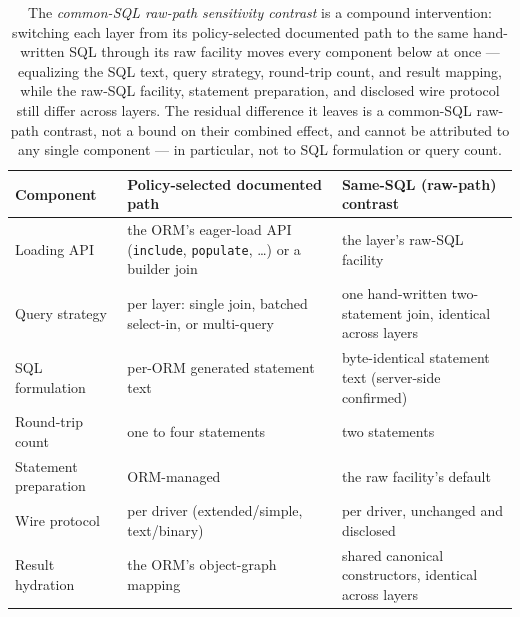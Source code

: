 \begin{table}[htbp]
  \centering
  \small
  \caption{The \emph{common-SQL raw-path sensitivity contrast} is a compound intervention: switching each layer from its
    policy-selected documented path to the same hand-written SQL through its raw facility moves every
    component below at once --- equalizing the SQL text, query strategy, round-trip count, and
    result mapping, while the raw-SQL facility, statement preparation, and disclosed wire protocol
    still differ across layers. The residual difference it leaves is a common-SQL raw-path contrast,
    not a bound on their combined effect, and cannot be attributed to any single component ---
    in particular, not to SQL formulation or query count.}
  \label{tab:samesql_components}
  \begin{tabular}{@{}l p{} p{}@{}}
    \toprule
    Component & Policy-selected documented path & Same-SQL (raw-path) contrast \\
    \midrule
    Loading API & the ORM's eager-load API (\texttt{include}, \texttt{populate}, \ldots) or a builder join & the layer's raw-SQL facility \\
    Query strategy & per layer: single join, batched select-in, or multi-query & one hand-written two-statement join, identical across layers \\
    SQL formulation & per-ORM generated statement text & byte-identical statement text (server-side confirmed) \\
    Round-trip count & one to four statements & two statements \\
    Statement preparation & ORM-managed & the raw facility's default \\
    Wire protocol & per driver (extended/simple, text/binary) & per driver, unchanged and disclosed \\
    Result hydration & the ORM's object-graph mapping & shared canonical constructors, identical across layers \\
    \bottomrule
  \end{tabular}
\end{table}
